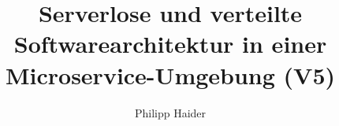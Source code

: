 \documentclass[master,german]{hgbthesis}
\title{Serverlose und verteilte Softwarearchitektur in einer Microservice-Umgebung (V5)}
\author{Philipp Haider}
\begin{document}

\frontmatter                    %

\maketitle
\tableofcontents

		
			

\mainmatter          %







%

\appendix                                            %


\MakeBibliography                        %

%

\end{document}
